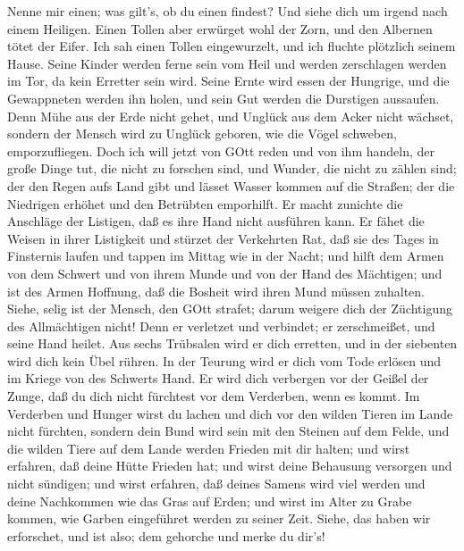  Nenne mir einen; was gilt's, ob du einen findest? Und siehe
dich um irgend nach einem Heiligen.  Einen Tollen aber
erwürget wohl der Zorn, und den Albernen tötet der Eifer. 
Ich sah einen Tollen eingewurzelt, und ich fluchte plötzlich seinem
Hause.  Seine Kinder werden ferne sein vom Heil und werden
zerschlagen werden im Tor, da kein Erretter sein wird. 
Seine Ernte wird essen der Hungrige, und die Gewappneten werden ihn
holen, und sein Gut werden die Durstigen aussaufen.  Denn
Mühe aus der Erde nicht gehet, und Unglück aus dem Acker nicht wächset,
 sondern der Mensch wird zu Unglück geboren, wie die Vögel
schweben, emporzufliegen.  Doch ich will jetzt von GOtt
reden und von ihm handeln,  der große Dinge tut, die nicht
zu forschen sind, und Wunder, die nicht zu zählen sind; 
der den Regen aufs Land gibt und lässet Wasser kommen auf die Straßen;
 der die Niedrigen erhöhet und den Betrübten emporhilft.
 Er macht zunichte die Anschläge der Listigen, daß es ihre
Hand nicht ausführen kann.  Er fähet die Weisen in ihrer
Listigkeit und stürzet der Verkehrten Rat,  daß sie des
Tages in Finsternis laufen und tappen im Mittag wie in der Nacht;
 und hilft dem Armen von dem Schwert und von ihrem Munde
und von der Hand des Mächtigen;  und ist des Armen
Hoffnung, daß die Bosheit wird ihren Mund müssen zuhalten. 
Siehe, selig ist der Mensch, den GOtt strafet; darum weigere dich der
Züchtigung des Allmächtigen nicht!  Denn er verletzet und
verbindet; er zerschmeißet, und seine Hand heilet.  Aus
sechs Trübsalen wird er dich erretten, und in der siebenten wird dich
kein Übel rühren.  In der Teurung wird er dich vom Tode
erlösen und im Kriege von des Schwerts Hand.  Er wird dich
verbergen vor der Geißel der Zunge, daß du dich nicht fürchtest vor dem
Verderben, wenn es kommt.  Im Verderben und Hunger wirst du
lachen und dich vor den wilden Tieren im Lande nicht fürchten,
 sondern dein Bund wird sein mit den Steinen auf dem Felde,
und die wilden Tiere auf dem Lande werden Frieden mit dir halten;
 und wirst erfahren, daß deine Hütte Frieden hat; und wirst
deine Behausung versorgen und nicht sündigen;  und wirst
erfahren, daß deines Samens wird viel werden und deine Nachkommen wie
das Gras auf Erden;  und wirst im Alter zu Grabe kommen,
wie Garben eingeführet werden zu seiner Zeit.  Siehe, das
haben wir erforschet, und ist also; dem gehorche und merke du dir's!

